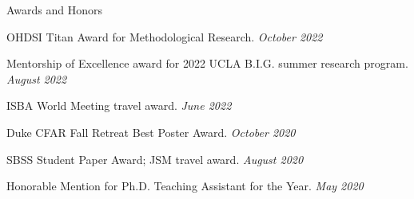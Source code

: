 \documentclass{resume} %
\begin{document}



%


\begin{rSection}{Awards and Honors}

OHDSI Titan Award for Methodological Research. 
\hfill {\em October 2022}

Mentorship of Excellence award for 2022 UCLA B.I.G. summer research program. \hfill {\em August 2022}

ISBA World Meeting travel award.
\hfill {\em June 2022}

Duke CFAR Fall Retreat Best Poster Award. 
\hfill {\em October 2020}

SBSS Student Paper Award; JSM travel award. \hfill {\em August 2020}

Honorable Mention for Ph.D. Teaching Assistant for the Year. 
\hfill {\em May 2020}


\end{rSection}


\end{document}
